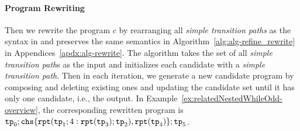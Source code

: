 \paragraph{Program Rewriting}
Then we rewrite the program $c$ by rearranging all \emph{simple transition paths} as the syntax in \cite{GulwaniJK09} and preserves the same semantics in Algorithm~\ref{alg:alg-refine_rewrite} in Appendices~\ref{apdx:alg-rewrite}.
The algorithm takes  the set of all \emph{simple transition path}s as the input and initializes each candidate with a \emph{simple transition path}.
Then in each iteration, we generate a new candidate program by composing and deleting existing ones and updating the candidate set until it has only one candidate, i.e., the output.
%
In Example~\ref{ex:relatedNestedWhileOdd-overview}, the corresponding rewritten program is
$ 
\tpath_0; \rpchoose{\rprepeat(\tpath_1; 4:\rprepeat(\tpath_3); \tpath_2),\rprepeat(\tpath_4) }; \tpath_5
$.

